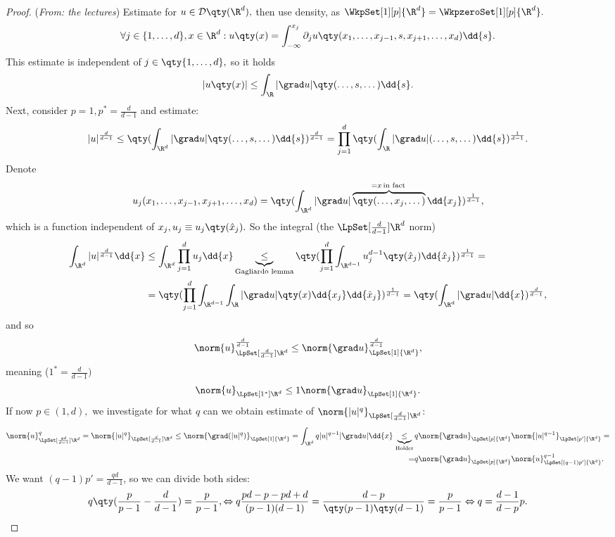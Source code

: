 \begin{proof}(\textit{From: the lectures})
	Estimate for $u \in \mathcal{D}\qty(\R^d),$ then use density, as $\WkpSet[1][p]{\R^{d}} = \WkpzeroSet[1][p]{\R^{d}}.$
	\[
		\forall j \in \{1,\dots,d\}, x \in \R^d: u\qty(x)=\int_{-\infty}^{x_j}\partial_{j}u\qty(x_1,\dots,x_{j-1},s,x_{j+1},\dots,x_d)\dd{s}.
	\]
	This estimate is independent of $j \in \qty{1, \dots,d},$ so it holds 
	\[
		|u\qty(x)| \leq \int_{\R}|\grad u|\qty(\dots,s,\dots)\dd{s}.
	\]
	Next, consider $p=1, p^{*}=\frac{d}{d-1}$ and estimate:
	\[
		|u|^{\frac{d}{d-1}}\leq \qty(\int_{\R^{d}}|\grad u| \qty(\dots, s, \dots)\dd{s})^{\frac{d}{d-1}} = \prod_{j=1}^d\qty(\int_{\R}|\grad u| (\dots, s, \dots) \dd{s})^{\frac{1}{d-1}}.
	\]
	Denote
	\[
		u_j(x_1, \dots, x_{j-1}, x_{j+1}, \dots, x_d) = \qty(\int_{\R^{d}}|\grad u|\overbrace{\qty(\dots, x_j, \dots)}^{=x \, \text{in fact} \,}\dd{x_j})^{\frac{1}{d-1}},
	\]
	which is a function independent of $x_j, u_j \equiv u_j\qty(\hat{x}_j).$
	So the integral (the $\LpSet[\frac{d}{d-1}]{\R^{d}}$ norm)
	\begin{align*}
		\int_{\R^d}|u|^{\frac{d}{d-1}}\dd{x} &\leq \int_{\R^d}\prod_{j=1}^d u_j \dd{x} \underbrace{\leq}_{\text{Gagliardo lemma}}\qty(\prod_{j=1}^d \int_{\R^{d-1}}u_j^{d-1}\qty(\hat{x}_j)\dd{\hat{x}_j})^{\frac{1}{d-1}}=\\
						     &=\qty(\prod_{j=1}^d \int_{\R^{d-1}}\int_{\R}|\grad u|\qty(x)\dd{x_j}\dd{\hat{x}_j})^{\frac{1}{d-1}} = \qty(\int_{\R^d}|\grad u|\dd{x})^{\frac{d}{d-1}},
	\end{align*}
	and so
	\[
		\norm{u}_{\LpSet[\frac{d}{d-1}]{\R^{d}}}^{\frac{d}{d-1}}\leq \norm{\grad u}_{\LpSet[1]{\R^{d}}}^{\frac{d}{d-1}},
	\]
	meaning ($1^{*} = \frac{d}{d-1})$
	\[
		\norm{u}_{\LpSet[1^{*}]{\R^{d}}}\leq 1 \norm{\grad u}_{\LpSet[1]{\R^{d}}}.
	\]
	If now $p \in (1,d),$ we investigate for what $q$ can we obtain estimate of $\norm{|u|^q}_{\LpSet[\frac{d}{d-1}]{\R^{d}}}$:
	\begin{align*}
		\norm{u}_{\LpSet[\frac{qd}{d-1}]{\R^d}}^q = \norm{|u|^q}_{\LpSet[\frac{d}{d-1}]{\R^d}} \leq \norm{\grad (|u|^q)}_{\LpSet[1]{\R^d}} = \int_{\R^d}q|u|^{q-1} |\grad u| \dd{x} \underbrace{\leq}_{\, \text{Holder} \,}&q \norm{\grad u}_{\LpSet[p]{\R^{d}}}\norm{|u|^{q-1}}_{\LpSet[p']{\R^{d}}}= \\
		=&q \norm{\grad u}_{\LpSet[p]{\R^d}} \norm{u}_{\LpSet[(q-1)p']{\R^d}}^{q-1}.
	\end{align*} We want $(q-1)p' = \frac{qd}{d-1}$, so we can divide both sides:
	\[
		q \qty(\frac{p}{p-1} - \frac{d}{d-1}) = \frac{p}{p-1}, \Leftrightarrow q\frac{pd-p-pd+d}{(p-1)(d-1)}=\frac{d-p}{\qty(p-1)\qty(d-1)}=\frac{p}{p-1} \Leftrightarrow q=\frac{d-1}{d-p}p.
\]
\end{proof}

